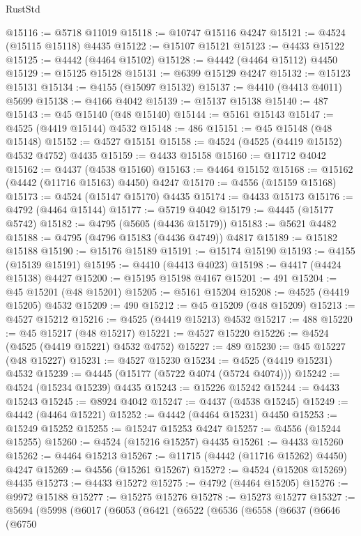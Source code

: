 \begin{lexlean}{RustStd}
\begin{coremodule}
@15116 := @5718 @11019
@15118 := @10747 @15116 @4247
@15121 := @4524 (@15115 @15118) @4435
@15122 := @15107 @15121
@15123 := @4433 @15122
@15125 := @4442 (@4464 @15102)
@15128 := @4442 (@4464 @15112) @4450
@15129 := @15125 @15128
@15131 := @6399 @15129 @4247
@15132 := @15123 @15131
@15134 := @4155 (@15097 @15132)
@15137 := @4410 (@4413 @4011) @5699
@15138 := @4166 @4042
@15139 := @15137 @15138
@15140 := 487
@15143 := @45 @15140 (@48 @15140)
@15144 := @5161 @15143
@15147 := @4525 (@4419 @15144) @4532
@15148 := 486
@15151 := @45 @15148 (@48 @15148)
@15152 := @4527 @15151
@15158 := @4524 (@4525 (@4419 @15152) @4532 @4752) @4435
@15159 := @4433 @15158
@15160 := @11712 @4042
@15162 := @4437 (@4538 @15160)
@15163 := @4464 @15152
@15168 := @15162 (@4442 (@11716 @15163) @4450) @4247
@15170 := @4556 (@15159 @15168)
@15173 := @4524 (@15147 @15170) @4435
@15174 := @4433 @15173
@15176 := @4792 (@4464 @15144)
@15177 := @5719 @4042
@15179 := @4445 (@15177 @5742)
@15182 := @4795 (@5605 (@4436 @15179))
@15183 := @5621 @4482
@15188 := @4795 (@4796 @15183 (@4436 @4749)) @4817
@15189 := @15182 @15188
@15190 := @15176 @15189
@15191 := @15174 @15190
@15193 := @4155 (@15139 @15191)
@15195 := @4410 (@4413 @4023)
@15198 := @4417 (@4424 @15138) @4427
@15200 := @15195 @15198 @4167
@15201 := 491
@15204 := @45 @15201 (@48 @15201)
@15205 := @5161 @15204
@15208 := @4525 (@4419 @15205) @4532
@15209 := 490
@15212 := @45 @15209 (@48 @15209)
@15213 := @4527 @15212
@15216 := @4525 (@4419 @15213) @4532
@15217 := 488
@15220 := @45 @15217 (@48 @15217)
@15221 := @4527 @15220
@15226 := @4524 (@4525 (@4419 @15221) @4532 @4752)
@15227 := 489
@15230 := @45 @15227 (@48 @15227)
@15231 := @4527 @15230
@15234 := @4525 (@4419 @15231) @4532
@15239 := @4445 (@15177 (@5722 @4074 (@5724 @4074)))
@15242 := @4524 (@15234 @15239) @4435
@15243 := @15226 @15242
@15244 := @4433 @15243
@15245 := @8924 @4042
@15247 := @4437 (@4538 @15245)
@15249 := @4442 (@4464 @15221)
@15252 := @4442 (@4464 @15231) @4450
@15253 := @15249 @15252
@15255 := @15247 @15253 @4247
@15257 := @4556 (@15244 @15255)
@15260 := @4524 (@15216 @15257) @4435
@15261 := @4433 @15260
@15262 := @4464 @15213
@15267 := @11715 (@4442 (@11716 @15262) @4450) @4247
@15269 := @4556 (@15261 @15267)
@15272 := @4524 (@15208 @15269) @4435
@15273 := @4433 @15272
@15275 := @4792 (@4464 @15205)
@15276 := @9972 @15188
@15277 := @15275 @15276
@15278 := @15273 @15277
@15327 := @5694
    (@5998
      (@6017
        (@6053
          (@6421
            (@6522
              (@6536
                (@6558
                  (@6637
                    (@6646
                      (@6750

\end{coremodule}
\end{lexlean}
